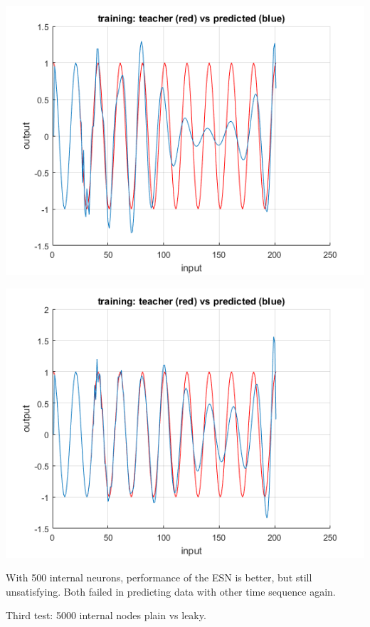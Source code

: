 \documentclass[a4paper, 12pt]{article}
\begin{document}
\begin{center}
\includegraphics[scale=0.6]{500plain.png}

\includegraphics[scale=0.6]{500leaky.png}
\end{center}

With 500 internal neurons, performance of the ESN is better, but still unsatisfying. Both failed in predicting data with other time sequence again.


Third test: 5000 internal nodes plain vs leaky.
\end{document}
